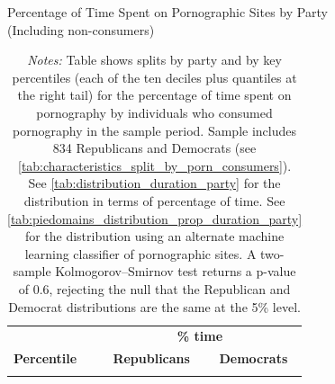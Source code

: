 \documentclass[12pt, letterpaper]{article}
\begin{document}
\begin{table}[ht] \centering \small \setlength\tabcolsep{10 pt}
	\caption{Percentage of Time Spent on Pornographic Sites by Party \\(Including non-consumers)}
	\label{tab:distribution_prop_duration_party_untruncated}
	\begin{adjustbox}{max width=\textwidth}
		\begin{tabular}{crr}
			\toprule
			\multicolumn{1}{l}{\textbf{}}&\multicolumn{2}{c}{\textbf{\% time}}\\
			\cmidrule(l){2-3}
			\multicolumn{1}{l}{\textbf{Percentile}}&\multicolumn{1}{c}{\textbf{Republicans}}&\multicolumn{1}{c}{\textbf{Democrats}}\\
			\midrule
			\\
			\bottomrule
		\end{tabular}
	\end{adjustbox}
	\caption*{\footnotesize \emph{Notes:} 
		Table shows splits by party and by key percentiles (each of the ten deciles plus quantiles at the right tail) for the percentage of time spent on pornography by individuals who consumed pornography in the sample period. 
		Sample includes 834 Republicans and Democrats (see \cref{tab:characteristics_split_by_porn_consumers}).
		See \cref{tab:distribution_duration_party} for the distribution in terms of percentage of time.
		See \cref{tab:piedomains_distribution_prop_duration_party} for the distribution using an alternate machine learning classifier of pornographic sites. 
		A two-sample Kolmogorov–Smirnov test returns a p-value of 0.6, rejecting the null that the Republican and Democrat distributions are the same at the 5\% level.
	}
\end{table}

\FloatBarrier
\clearpage
\end{document}

